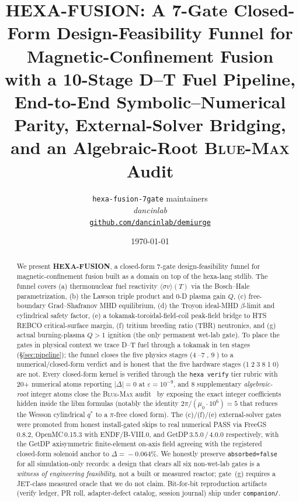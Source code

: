\documentclass[11pt,a4paper]{article}
\title{
  \textbf{HEXA-FUSION: A 7-Gate Closed-Form Design-Feasibility Funnel
  for Magnetic-Confinement Fusion} \\[6pt]
  \large with a 10-Stage D--T Fuel Pipeline, End-to-End Symbolic--Numerical
  Parity, External-Solver Bridging, and an Algebraic-Root \textsc{Blue-Max} Audit
}
\author{
  \texttt{hexa-fusion-7gate} maintainers\\
  \normalsize\textit{dancinlab}\\[2pt]
  \normalsize\href{https://github.com/dancinlab/demiurge}{\texttt{github.com/dancinlab/demiurge}}
}
\date{\today}
\begin{document}
\maketitle

\begin{abstract}
We present \textbf{HEXA-FUSION}, a closed-form 7-gate design-feasibility
funnel for magnetic-confinement fusion built as a domain on top of the
hexa-lang stdlib. The funnel covers (a) thermonuclear fuel reactivity
$\langle\sigma v\rangle(T)$ via the Bosch--Hale parametrization, (b) the
Lawson triple product and 0-D plasma gain $Q$, (c) free-boundary
Grad--Shafranov MHD equilibrium, (d) the Troyon ideal-MHD $\beta$-limit
and cylindrical safety factor, (e) a tokamak-toroidal-field-coil
peak-field bridge to HTS REBCO critical-surface margin, (f) tritium
breeding ratio (TBR) neutronics, and (g) actual burning-plasma
$Q\!>\!1$ ignition (the only permanent wet-lab gate). To place the
gates in physical context we trace D--T fuel through a tokamak in ten
stages (\S\ref{sec:pipeline}); the funnel closes the five physics
stages (\textcircled{\scriptsize 4}--\textcircled{\scriptsize 7},
\textcircled{\scriptsize 9}) to a numerical/closed-form verdict and is
honest that the five hardware stages
(\textcircled{\scriptsize 1}\textcircled{\scriptsize 2}\textcircled{\scriptsize 3}\textcircled{\scriptsize 8}\textcircled{\scriptsize 10})
are not. Every closed-form kernel is verified through the
\texttt{hexa verify} tier rubric with 20+ numerical atoms reporting
$\big|\Delta\big|\!=\!0$ at $\varepsilon\!=\!10^{-9}$, and 8
supplementary \emph{algebraic-root} integer atoms close the
\textsc{Blue-Max} audit~\citep{anthropic2026hexag69} by exposing the
exact integer coefficients hidden inside the libm formulas (notably the
identity $2\pi/(\mu_0\!\cdot\!10^{6})=5$ that reduces the Wesson
cylindrical $q^{*}$ to a $\pi$-free closed form). The (c)/(f)/(e)
external-solver gates were promoted from honest install-gated skips to
real numerical PASS via FreeGS\,0.8.2, OpenMC\,0.15.3 with
ENDF/B-VIII.0, and GetDP\,3.5.0\,/\,4.0.0 respectively, with the
GetDP axisymmetric finite-element on-axis field agreeing with the
registered closed-form solenoid anchor to $\Delta\!=\!-0.064\%$.
We honestly preserve \texttt{absorbed=false} for all simulation-only
records: a design that clears all six non-wet-lab gates is a
\emph{witness of engineering feasibility}, not a built or measured
reactor; gate~(g) requires a JET-class measured oracle that we do not
claim. Bit-for-bit reproduction artifacts (verify ledger, PR roll,
adapter-defect catalog, session journal) ship under \texttt{companion/}.
\end{abstract}
\end{document}
